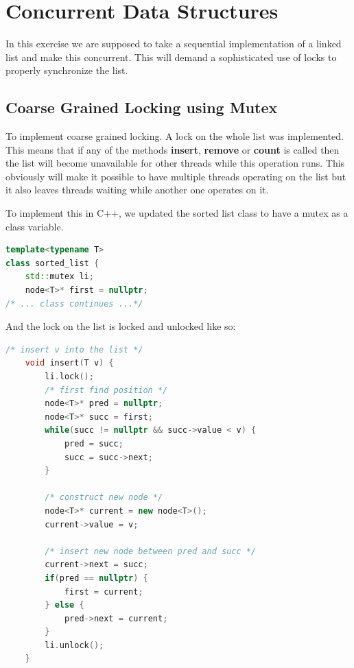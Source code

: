 \section{Concurrent Data Structures}

In this exercise we are supposed to take a sequential implementation of a 
linked list and make this concurrent. This will demand a sophisticated use of
locks to properly synchronize the list.

\subsection{Coarse Grained Locking using Mutex}

To implement coarse grained locking. A lock on the whole list was implemented.
This means that if any of the methods \textbf{insert}, \textbf{remove} or 
\textbf{count} is called then the list will become unavailable for other threads while 
this operation runs. This obviously will make it possible to have multiple 
threads operating on the list but it also leaves threads waiting while another 
one operates on it.

To implement this in C++, we updated the sorted list class to have a mutex as a
class variable.

\begin{lstlisting}[language=C++, caption=Sorted list with std::mutex]
template<typename T>
class sorted_list {
	std::mutex li;
	node<T>* first = nullptr;
/* ... class continues ...*/
\end{lstlisting}

And the lock on the list is locked and unlocked like so:

\begin{lstlisting}[language=C++, caption=Coarse-Grained Insert]
    /* insert v into the list */
    void insert(T v) {
        li.lock();
        /* first find position */
        node<T>* pred = nullptr;
        node<T>* succ = first;
        while(succ != nullptr && succ->value < v) {
            pred = succ;
            succ = succ->next;
        }
        
        /* construct new node */
        node<T>* current = new node<T>();
        current->value = v;
    
        /* insert new node between pred and succ */
        current->next = succ;
        if(pred == nullptr) {
            first = current;
        } else {
            pred->next = current;
        }
        li.unlock();
    }
\end{lstlisting}

